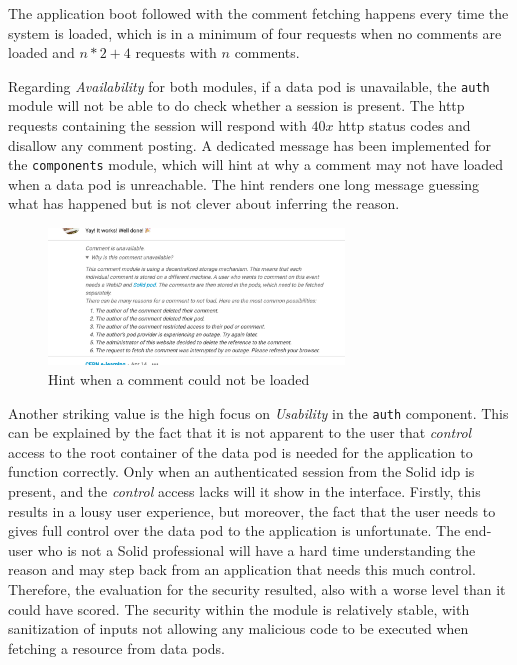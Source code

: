 The application boot followed with the comment fetching happens every time the system is loaded, which is in a minimum of four requests when no comments are loaded and $n*2+4$ requests with $n$ comments.

Regarding \textit{Availability} for both modules, if a data pod is unavailable, the \texttt{auth} module will not be able to do check whether a session is present. The \gls{http} requests containing the session will respond with $40x$ \gls{http} status codes and disallow any comment posting. A dedicated message has been implemented for the \texttt{components} module, which will hint at why a comment may not have loaded when a data pod is unreachable. The hint renders one long message guessing what has happened but is not clever about inferring the reason.

\begin{figure}[H]
    \centering
    \includegraphics[width=0.7\textwidth]{prototype/poc-comment-unavailable_comment.png}
    \caption{Hint when a comment could not be loaded}
    \label{fig:poc-comment-unavailable_comment}
\end{figure}

Another striking value is the high focus on \textit{Usability} in the \texttt{auth} component. This can be explained by the fact that it is not apparent to the user that \textit{control} access to the root container of the data pod is needed for the application to function correctly. Only when an authenticated session from the Solid \gls{idp} is present, and the \textit{control} access lacks will it show in the interface. Firstly, this results in a lousy user experience, but moreover, the fact that the user needs to gives full control over the data pod to the application is unfortunate. The end-user who is not a Solid professional will have a hard time understanding the reason and may step back from an application that needs this much control. Therefore, the evaluation for the security resulted, also with a worse level than it could have scored. The security within the module is relatively stable, with sanitization of inputs not allowing any malicious code to be executed when fetching a resource from data pods.
\vspace{0.5cm}
